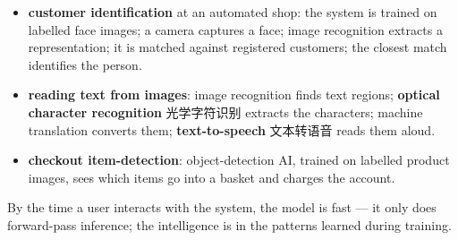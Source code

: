 \documentclass[11pt]{article}
\begin{document}
\begin{itemize}
\item \textbf{customer identification} at an automated shop: the system is trained on labelled face images; a camera captures a face; image recognition extracts a representation; it is matched against registered customers; the closest match identifies the person.

\item \textbf{reading text from images}: image recognition finds text regions; \textbf{optical character recognition} 光学字符识别 extracts the characters; machine translation converts them; \textbf{text-to-speech} 文本转语音 reads them aloud.

\item \textbf{checkout item-detection}: object-detection AI, trained on labelled product images, sees which items go into a basket and charges the account.

\end{itemize}

By the time a user interacts with the system, the model is fast — it only does forward-pass inference; the intelligence is in the patterns learned during training.
\end{document}
